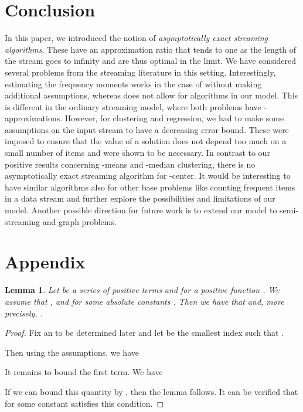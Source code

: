 \documentclass[a4paper,11pt,oneside,english,onecolumn]{article}
\newtheorem{lemma}[theorem]{Lemma}
\theoremstyle{definition}
\begin{document}
\section{Conclusion}
\label{conclusion}
In this paper, we introduced the notion of \emph{asymptotically exact streaming algorithms}. These have an approximation ratio that tends to one as the length of the stream goes to infinity and are thus optimal in the limit. We have considered several problems from the streaming literature in this setting. Interestingly, estimating the frequency moments works in the case of  without making additional assumptions, whereas  does not allow for algorithms in our model. This is different in the ordinary streaming model, where both problems have -approximations. However, for clustering and regression, we had to make some assumptions on the input stream to have a decreasing error bound. These were imposed to ensure that the value of a solution does not depend too much on a small number of items and were shown to be necessary. In contrast to our positive results concerning -means and -median clustering, there is no asymptotically exact streaming algorithm for -center. It would be interesting to have similar algorithms also for other base problems like counting frequent items in a data stream and further explore the possibilities and limitations of our model. Another possible direction for future work is to extend our model to semi-streaming and graph problems.







\section{Appendix}
\label{append}

\begin{lemma}
\label{lemma:series}
Let  be a series of positive terms and  for a positive function . We assume that ,  and  for some absolute constants . Then we have that  and, more precisely, .
\end{lemma}
\begin{proof}
Fix an  to be determined later and let  be the smallest index such that .

Then using the assumptions, we have


It remains to bound the first term. We have

If we can bound this quantity by , then the lemma follows. It can be verified that  for some constant  satisfies this condition.
\end{proof}
\end{document}
